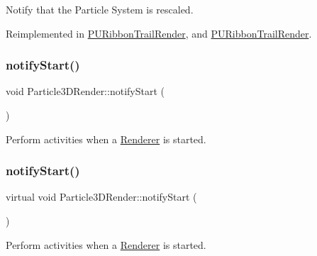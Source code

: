 Notify that the Particle System is rescaled. 

Reimplemented in \hyperlink{classPURibbonTrailRender_aeb5cf442af12f6f2593f1b9020281577}{P\+U\+Ribbon\+Trail\+Render}, and \hyperlink{classPURibbonTrailRender_a84442c6a329c8a1318c35655e18fdf69}{P\+U\+Ribbon\+Trail\+Render}.

\mbox{\label{classParticle3DRender_a77140f54f79cfbfc851e044d9a1c70ba}} 
\subsubsection{\texorpdfstring{notify\+Start()}{notifyStart()}\hspace{0.1cm}{\footnotesize\ttfamily [1/2]}}
{\footnotesize\ttfamily void Particle3\+D\+Render\+::notify\+Start (\begin{DoxyParamCaption}{ }\end{DoxyParamCaption})\hspace{0.3cm}{\ttfamily [virtual]}}

Perform activities when a \hyperlink{classRenderer}{Renderer} is started. \mbox{\label{classParticle3DRender_abf92e3a07925ce5b936322280cb59068}} 
\subsubsection{\texorpdfstring{notify\+Start()}{notifyStart()}\hspace{0.1cm}{\footnotesize\ttfamily [2/2]}}
{\footnotesize\ttfamily virtual void Particle3\+D\+Render\+::notify\+Start (\begin{DoxyParamCaption}{ }\end{DoxyParamCaption})\hspace{0.3cm}{\ttfamily [virtual]}}

Perform activities when a \hyperlink{classRenderer}{Renderer} is started. \mbox{\label{classParticle3DRender_a69d51309d5bf42bf947a4601fc9d1afe}} 
